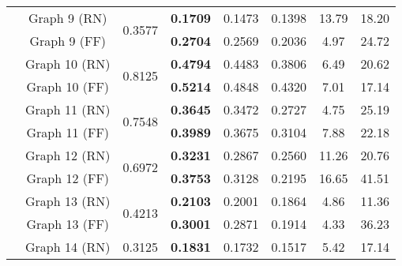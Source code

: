 \documentclass[format=acmsmall, review=false, screen=true]{acmart}
\begin{document}
\begin{table}[t]
{\begin{tabular}{|c|c|c|c|c|c|c|c|}
\cline{2-8} 
&Graph 9 (RN)                                            & \multirow{2}{*}{0.3577} & {\bf 0.1709}    & 0.1473 & 0.1398                                                      & 13.79                                                & 18.20 \\
& Graph 9 (FF) &    & {\bf 0.2704}    & 0.2569 & 0.2036                                                      & 4.97                                                &24.72 \\
\cline{2-8} 
&Graph 10 (RN)                                            & \multirow{2}{*}{0.8125} & {\bf 0.4794}    & 0.4483 & 0.3806                                                      & 6.49                                                & 20.62 \\
& Graph 10 (FF) &    & {\bf 0.5214}    & 0.4848 & 0.4320                                                      & 7.01                                                & 17.14 \\
\cline{2-8} 
&Graph 11 (RN)                                            & \multirow{2}{*}{0.7548} & {\bf 0.3645}    & 0.3472 & 0.2727                                                      & 4.75                                                & 25.19 \\
& Graph 11 (FF) &    & {\bf 0.3989}    & 0.3675 & 0.3104                                                      & 7.88                                                & 22.18 \\
\cline{2-8} 
&Graph 12 (RN)                                            & \multirow{2}{*}{0.6972} & {\bf 0.3231}    & 0.2867 & 0.2560                                                      & 11.26                                                & 20.76 \\
& Graph 12 (FF) &    & {\bf 0.3753 }   & 0.3128 & 0.2195                                                      &16.65                                                & 41.51 \\
\cline{2-8} 
&Graph 13 (RN)                                            & \multirow{2}{*}{0.4213} & {\bf 0.2103}    & 0.2001 & 0.1864                                                      & 4.86 & 11.36 \\
& Graph 13 (FF) &    & {\bf 0.3001}    & 0.2871 & 0.1914                                                      & 4.33                                                & 36.23 \\
\cline{2-8} 
&Graph 14 (RN)                                            & \multirow{2}{*}{0.3125} & {\bf 0.1831}    & 0.1732 & 0.1517                                                      & 5.42  & 17.14 \\

\end{tabular}}
\end{table}
\end{document}
